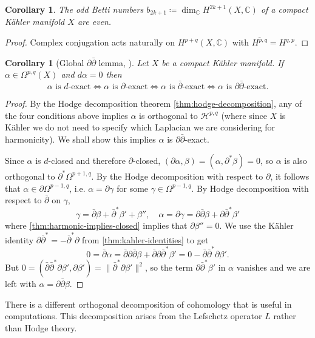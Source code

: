 \documentclass{report}
\theoremstyle{plain}
\newtheorem{corollary}[theorem]{Corollary}
\theoremstyle{definition}
\theoremstyle{remark}
\newcommand{\di}{\partial}
\newcommand{\bC}{\mathbb{C}}
\newcommand{\cH}{\mathcal{H}}
\newcommand{\bdi}{\bar{\di}}
\begin{document}
\begin{corollary}
  The odd Betti numbers $b_{2k+1} \coloneqq \dim_{\bC} H^{2k+1}(X,
  \bC)$ of a compact K\"ahler manifold $X$ are even.
\end{corollary}

\begin{proof}
  Complex conjugation acts naturally on $H^{p+q}(X, \bC)$ with
  $\overline{H^{p,q}} = H^{q,p}$.
\end{proof}

\begin{corollary}[Global $\di\bdi$ lemma, {\cite[Corollary 3.2.10]{Huybrechts2005}}] \label{thm:deldelbar-lemma}
  Let $X$ be a compact K\"ahler manifold. If $\alpha \in
  \Omega^{p,q}(X)$ and $d\alpha = 0$ then
  \[ \alpha \text{ is } d\text{-exact} \iff \alpha \text{ is } \di\text{-exact} \iff \alpha \text{ is } \bdi\text{-exact} \iff \alpha \text{ is } \di\bdi\text{-exact}. \]
\end{corollary}

\begin{proof}
  By the Hodge decomposition theorem \ref{thm:hodge-decomposition},
  any of the four conditions above implies $\alpha$ is orthogonal to
  $\cH^{p,q}$ (where since $X$ is K\"ahler we do not need to specify
  which Laplacian we are considering for harmonicity). We shall show
  this implies $\alpha$ is $\di\bdi$-exact.

  Since $\alpha$ is $d$-closed and therefore $\di$-closed, $(\di
  \alpha, \beta) = (\alpha, \di^*\beta) = 0$, so $\alpha$ is also
  orthogonal to $\di^*\Omega^{p+1,q}$. By the Hodge decomposition with
  respect to $\di$, it follows that $\alpha \in \di\Omega^{p-1,q}$,
  i.e. $\alpha = \di \gamma$ for some $\gamma \in \Omega^{p-1,q}$. By
  Hodge decomposition with respect to $\bdi$ on $\gamma$,
  \[ \gamma = \bdi\beta + \bdi^*\beta' + \beta'', \quad \alpha = \di\gamma = \di\bdi\beta + \di\bdi^*\beta' \]
  where \ref{thm:harmonic-implies-closed} implies that $\di\beta'' =
  0$. We use the K\"ahler identity $\di\bdi^* = -\bdi^*\di$ from
  \ref{thm:kahler-identities} to get
  \[ 0 = \bdi\alpha = \bdi\di\bdi\beta + \bdi\di\bdi^*\beta' = 0 - \bdi\bdi^*\di\beta'. \]
  But $0 = (\bdi\bdi^*\di\beta', \di\beta') = \|\bdi^*\di\beta'\|^2$,
  so the term $\di\bdi^*\beta'$ in $\alpha$ vanishes and we are left
  with $\alpha = \di\bdi\beta$.
\end{proof}

There is a different orthogonal decomposition of cohomology that is
useful in computations. This decomposition arises from the Lefschetz
operator $L$ rather than Hodge theory.
\end{document}
